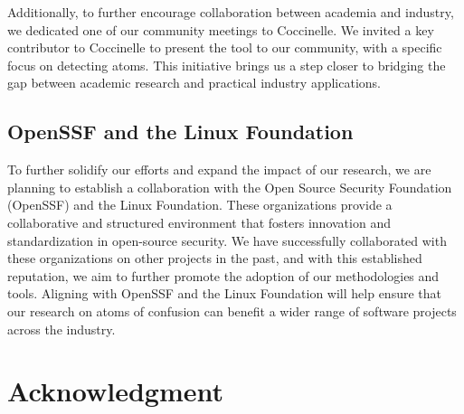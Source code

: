 \documentclass[conference]{IEEEtran}
\begin{document}
Additionally, to further encourage collaboration between academia and industry, we dedicated one of our community meetings to Coccinelle. We invited a key contributor to Coccinelle to present the tool to our community, with a specific focus on detecting atoms. This initiative brings us a step closer to bridging the gap between academic research and practical industry applications.

\subsection{OpenSSF and the Linux Foundation}

To further solidify our efforts and expand the impact of our research, we are planning to establish a collaboration with the Open Source Security Foundation (OpenSSF) and the Linux Foundation. These organizations provide a collaborative and structured environment that fosters innovation and standardization in open-source security. We have successfully collaborated with these organizations on other projects in the past, and with this established reputation, we aim to further promote the adoption of our methodologies and tools. Aligning with OpenSSF and the Linux Foundation will help ensure that our research on atoms of confusion can benefit a wider range of software projects across the industry.

\section*{Acknowledgment}


{\scriptsize  }
\end{document}
